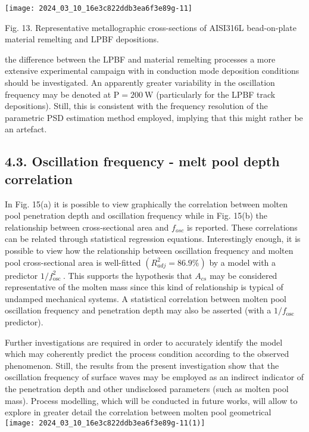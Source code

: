 \documentclass[10pt]{article}
\begin{document}
\begin{center}
\texttt{[image: 2024\_03\_10\_16e3c822ddb3ea6f3e89g-11]}
\end{center}

Fig. 13. Representative metallographic cross-sections of AISI316L bead-on-plate material remelting and LPBF depositions.

the difference between the LPBF and material remelting processes a more extensive experimental campaign with in conduction mode deposition conditions should be investigated. An apparently greater variability in the oscillation frequency may be denoted at $\mathrm{P}=200 \mathrm{~W}$ (particularly for the LPBF track depositions). Still, this is consistent with the frequency resolution of the parametric PSD estimation method employed, implying that this might rather be an artefact.

\subsection*{4.3. Oscillation frequency - melt pool depth correlation}
In Fig. 15(a) it is possible to view graphically the correlation between molten pool penetration depth and oscillation frequency while in Fig. 15(b) the relationship between cross-sectional area and $f_{o s c}$ is reported. These correlations can be related through statistical regression equations. Interestingly enough, it is possible to view how the relationship between oscillation frequency and molten pool cross-sectional area is well-fitted $\left(R_{a d j}^{2}=86.9 \%\right)$ by a model with a predictor $1 / f_{\text {osc }}^{2}$. This supports the hypothesis that $A_{c s}$ may be considered representative of the molten mass since this kind of relationship is typical of undamped mechanical systems. A statistical correlation between molten pool oscillation frequency and penetration depth may also be asserted (with a $1 / f_{\text {osc }}$ predictor).

Further investigations are required in order to accurately identify the model which may coherently predict the process condition according to the observed phenomenon. Still, the results from the present investigation show that the oscillation frequency of surface waves may be employed as an indirect indicator of the penetration depth and other undisclosed parameters (such as molten pool mass). Process modelling, which will be conducted in future works, will allow to explore in greater detail the correlation between molten pool geometrical\\
\texttt{[image: 2024\_03\_10\_16e3c822ddb3ea6f3e89g-11(1)]}
\end{document}
